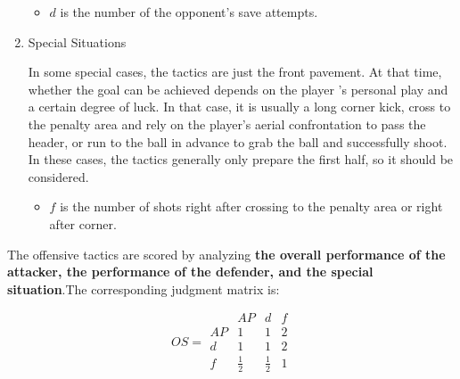 \documentclass{mcmthesis}
\begin{document}
\begin{enumerate}
	\begin{itemize}
		\item $d$ is the number of the opponent's save attempts.
	\end{itemize}

	\item Special Situations
	
	\qquad In some special cases, the tactics are just the front pavement. At that time, whether the goal can be achieved depends on the player ’s personal play and a certain degree of luck. In that case, it is usually a long corner kick, cross to the penalty area and rely on the player's aerial confrontation to pass the header, or run to the ball in advance to grab the ball and successfully shoot. In these cases, the tactics generally only prepare the first half, so it should be considered.

	\begin{itemize}
		\item $f$ is the number of shots right after crossing to the penalty area or right after corner.
	\end{itemize}

	\end{enumerate}
	
	The offensive tactics are scored by analyzing \textbf{the overall performance of the attacker, the performance of the defender, and the special situation}.The corresponding judgment matrix is:

	\begin{equation}\label{mat:2}
		OS=
	  \begin{matrix}
		& AP & d &f\\
   		AP & 1 & 1 & 2 \\
   		d & 1 & 1 & 2 \\
   		f & \frac{1}{2} & \frac{1}{2} & 1
  	\end{matrix}
	\end{equation}
	
\end{document}
